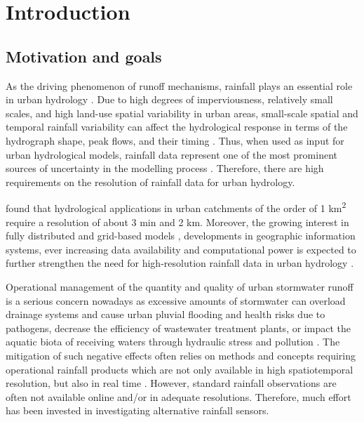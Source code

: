 \documentclass{ctuthesis}\usepackage[]{graphicx}\usepackage[]{color}
\begin{document}
        \maketitle
        


\chapter{Introduction} \label{chap1}

\section{Motivation and goals}

As the driving phenomenon of runoff mechanisms, rainfall plays an essential role in urban hydrology \citep{berneTemporalSpatialResolution2004}. Due to high degrees of imperviousness, relatively small scales, and high land-use spatial variability in urban areas, small-scale spatial and temporal rainfall variability can affect the hydrological response in terms of the hydrograph shape, peak flows, and their timing \citep{cristianoSpatialTemporalVariability2017, rico-ramirezQuantifyingRadarrainfallUncertainties2015}. Thus, when used as input for urban hydrological models, rainfall data represent one of the most prominent sources of uncertainty in the modelling process \citep{schellartInfluenceRainfallEstimation2012, thorndahlEventBasedUncertainty2008}. Therefore, there are high requirements on the resolution of rainfall data for urban hydrology.

\cite{berneTemporalSpatialResolution2004} found that hydrological applications in urban catchments of the order of 1 km\textsuperscript{2} require a resolution of about 3 min and 2 km. Moreover, the growing interest in fully distributed and grid-based models \citep{ochoa-rodriguezImpactSpatialTemporal2015, ichibaScaleEffectChallenges2018}, developments in geographic information systems, ever increasing data availability and computational power is expected to further strengthen the need for high-resolution rainfall data in urban hydrology \citep{ochoa-rodriguezReviewRadarRain2019, salvadoreHydrologicalModellingUrbanized2015}. 

Operational management of the quantity and quality of urban stormwater runoff is a serious concern nowadays as excessive amounts of stormwater can overload drainage systems and cause urban pluvial flooding and health risks due to pathogens, decrease the efficiency of wastewater treatment plants, or impact the aquatic biota of receiving waters through hydraulic stress and pollution \citep{tsihrintzisModelingManagementUrban1997}. The mitigation of such negative effects often relies on methods and concepts requiring operational rainfall products which are not only available in high spatiotemporal resolution, but also in real time \citep{einfaltRoadmapUseRadar2004}. However, standard rainfall observations are often not available online and/or in adequate resolutions. Therefore, much effort has been invested in investigating alternative rainfall sensors.
\end{document}
